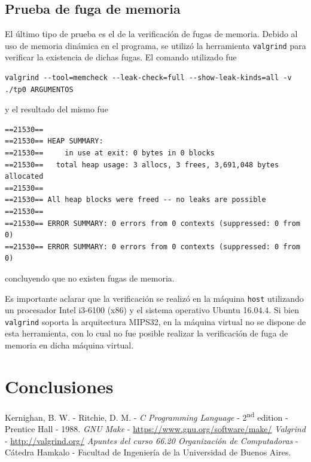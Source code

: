 
\clearpage

\subsection{Prueba de fuga de memoria}
El último tipo de prueba es el de la verificación de fugas de memoria. Debido al uso de memoria dinámica en el programa, se utilizó la herramienta \texttt{valgrind} \cite{valgrind} para verificar la existencia de dichas fugas. El comando utilizado fue 
\begin{lstlisting}
valgrind --tool=memcheck --leak-check=full --show-leak-kinds=all -v ./tp0 ARGUMENTOS
\end{lstlisting}
y el resultado del mismo fue 
\begin{lstlisting}
==21530== 
==21530== HEAP SUMMARY:
==21530==     in use at exit: 0 bytes in 0 blocks
==21530==   total heap usage: 3 allocs, 3 frees, 3,691,048 bytes allocated
==21530== 
==21530== All heap blocks were freed -- no leaks are possible
==21530== 
==21530== ERROR SUMMARY: 0 errors from 0 contexts (suppressed: 0 from 0)
==21530== ERROR SUMMARY: 0 errors from 0 contexts (suppressed: 0 from 0)
\end{lstlisting}
concluyendo que no existen fugas de memoria.

Es importante aclarar que la verificación se realizó en la máquina \texttt{host} utilizando un procesador Intel i3-6100 (x86) y el sistema operativo Ubuntu 16.04.4. Si bien \texttt{valgrind} soporta la arquitectura MIPS32, en la máquina virtual no se dispone de esta herramienta, con lo cual no fue posible realizar la verificación de fuga de memoria en dicha máquina virtual.

\section{Conclusiones}

\clearpage
\begin{thebibliography}{10}
	 Kernighan, B. W. - Ritchie, D. M. - \emph{C Programming Language} - 2\textsuperscript{nd} edition - Prentice Hall - 1988.
	 \emph{GNU Make} - \hyperlink{make}{https://www.gnu.org/software/make/}
	 \emph{Valgrind} - \hyperlink{valgrind}{http://valgrind.org/}
	 \emph{Apuntes del curso 66.20 Organización de Computadoras} - Cátedra Hamkalo - Facultad de Ingeniería de la Universidad de Buenos Aires.
\end{thebibliography}
\clearpage

